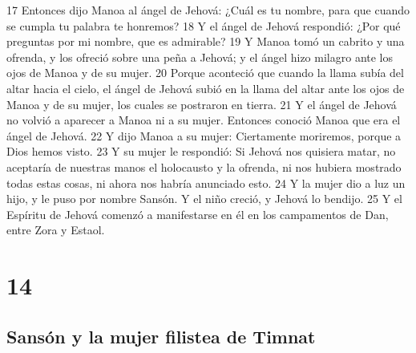 17 Entonces dijo Manoa al ángel de Jehová: ¿Cuál es tu nombre, para que cuando se cumpla tu palabra te honremos?
18 Y el ángel de Jehová respondió: ¿Por qué preguntas por mi nombre, que es admirable?
19 Y Manoa tomó un cabrito y una ofrenda, y los ofreció sobre una peña a Jehová; y el ángel hizo milagro ante los ojos de Manoa y de su mujer.
20 Porque aconteció que cuando la llama subía del altar hacia el cielo, el ángel de Jehová subió en la llama del altar ante los ojos de Manoa y de su mujer, los cuales se postraron en tierra.
21 Y el ángel de Jehová no volvió a aparecer a Manoa ni a su mujer. Entonces conoció Manoa que era el ángel de Jehová.
22 Y dijo Manoa a su mujer: Ciertamente moriremos, porque a Dios hemos visto.
23 Y su mujer le respondió: Si Jehová nos quisiera matar, no aceptaría de nuestras manos el holocausto y la ofrenda, ni nos hubiera mostrado todas estas cosas, ni ahora nos habría anunciado esto.
24 Y la mujer dio a luz un hijo, y le puso por nombre Sansón. Y el niño creció, y Jehová lo bendijo.
25 Y el Espíritu de Jehová comenzó a manifestarse en él en los campamentos de Dan, entre Zora y Estaol.

\chapter{14}

\section*{Sansón y la mujer filistea de Timnat}


